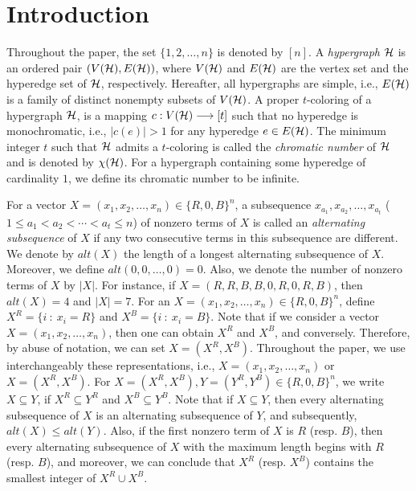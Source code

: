 \documentclass[11pt]{article}
\begin{document}
\section{Introduction}
Throughout the paper, the set $\{1,2,\ldots, n\}$ is denoted by $[n]$.
A {\it hypergraph} ${\cal H}$ is an ordered pair $(V({\cal H}),E({\cal H}))$,
where $V({\cal H})$ and $E({\cal H})$ are the vertex set and the hyperedge set of ${\cal H}$, respectively.
Hereafter, all hypergraphs are  simple, i.e.,
$E({\cal H})$ is a family of distinct nonempty subsets of $V({\cal H})$.
A proper $t$-coloring of a hypergraph ${\cal H}$, is a mapping $c:V({\cal H})\longrightarrow [t]$
such that no hyperedge is monochromatic, i.e.,
$|c(e)|>1$ for any hyperedge $e\in E({\cal H})$.
The minimum integer $t$ such that ${\cal H}$ admits a $t$-coloring
is called the {\it chromatic number} of ${\cal H}$ and is denoted by $\chi({\cal H})$.
For a hypergraph containing some hyperedge of cardinality $1$, we define its chromatic number to be infinite.

For a  vector $X=(x_1,x_2,\ldots,x_n)\in \{R,0,B\}^n$,
a subsequence $x_{a_1}, x_{a_2},\ldots,x_{a_t}$ ($1\leq {a_1}<{a_2}<\cdots<{a_t}\leq n$) of nonzero terms of $X$
is called an {\it alternating subsequence} of $X$ if any
two consecutive terms in this subsequence are different. We denote by $alt(X)$ the length of a longest alternating subsequence of $X$.
Moreover, we define $alt(0,0,\ldots,0)=0$. Also,
we denote the number of nonzero terms of $X$ by $|X|$.
For instance, if
$X=(R,R,B,B,0,R,0,R,B)$, then $alt(X)=4$ and $|X|=7$.
For an $X=(x_1,x_2,\ldots,x_n)\in\{R,0,B\}^n$, define
$X^R=\{i\ :\ x_i=R\}$ and $X^B=\{i\ :\ x_i=B\}$.
Note that if we consider a vector $X=(x_1,x_2,\ldots,x_n)$, then one can obtain $X^R$ and $X^B$, and conversely.
Therefore, by abuse of notation, we can set $X=(X^R,X^B)$.
Throughout the paper, we use interchangeably these representations, i.e.,
$X=(x_1,x_2,\ldots,x_n)$ or $X=(X^R,X^B)$.
For $X=(X^R,X^B), Y=(Y^R,Y^B)\in \{R, 0, B\}^n$, we write
$X\subseteq Y$, if $X^R \subseteq Y^R$ and $X^B \subseteq Y^B$.
Note that if $X\subseteq Y$, then every alternating subsequence of $X$
is an alternating subsequence of $Y$, and subsequently, $alt(X)\leq alt(Y)$.
Also, if the first nonzero term of $X$ is $R$ (resp. $B$),
then every alternating subsequence of $X$ with the maximum length begins with $R$ (resp. $B$), and moreover, we can conclude that $X^R$ (resp. $X^B$) contains the smallest integer of $X^R\cup X^B$.
\end{document}
